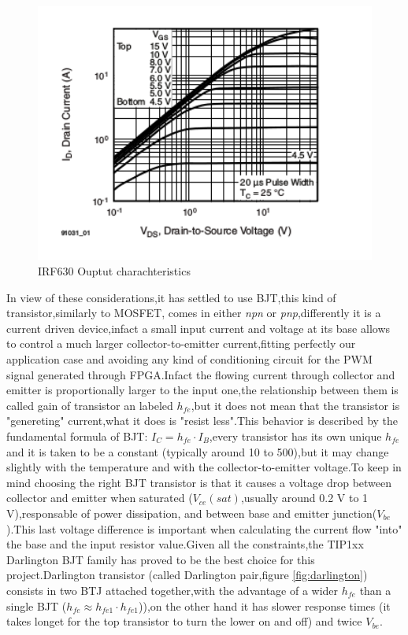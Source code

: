 \begin{figure}[!ht]
	\centering
	\includegraphics[width=1.0\textwidth]			 {figures/IRF630_charachteristic}
	\caption{IRF630 Ouptut charachteristics}
	\label{fig:IRF630_characteristic}
\end{figure}

In view of these considerations,it has settled to use BJT,this kind of transistor,similarly to MOSFET, comes in either \emph{npn} or \emph{pnp},differently it is a current driven device,infact a small input current and voltage at its base allows to control a much larger collector-to-emitter current,fitting perfectly our application case and avoiding any kind of conditioning circuit for the PWM signal generated through FPGA.Infact the flowing current through collector and emitter is proportionally larger to the input one,the relationship between them is called gain of transistor an labeled $h_{fe}$,but it does not mean that the transistor is "genereting" current,what it does is "resist less".This behavior is described by the fundamental formula of BJT: $I_C=h_{fe}\cdot I_B$,every transistor has its own unique $h_{fe}$ and it is taken to be a constant (typically around 10 to 500),but it may change slightly with the temperature and with the collector-to-emitter voltage.To keep in mind choosing the right BJT transistor is that it causes a voltage drop between collector and emitter when saturated ($V_{ce}(sat)$,usually around 0.2 V to 1 V),responsable of power dissipation, and between base and emitter junction($V_{be}$).This last voltage difference is important when calculating the current flow "into" the base and the input resistor value.Given all the constraints,the TIP1xx Darlington BJT family has proved to be the best choice for this project.Darlington transistor (called Darlington pair,figure \ref{fig:darlington}) consists in two BTJ attached together,with the advantage of a wider $h_{fe}$ than a single BJT ($h_{fe}\approx h_{fe1}\cdot h_{fe1}$)),on the other hand it has slower response times (it takes longet for the top transistor to turn the lower on and off) and twice $V_{be}$.

